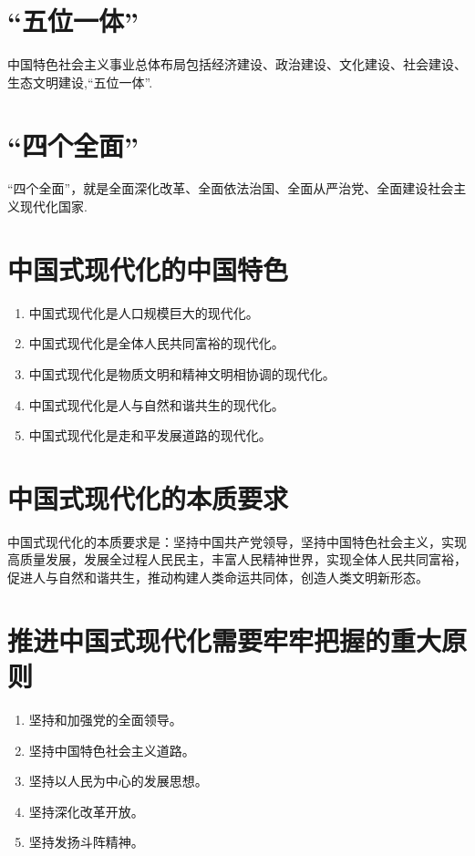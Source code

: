 \documentclass[12pt, a4paper, oneside]{ctexbook}
\begin{document}
\section{“五位一体”}

中国特色社会主义事业总体布局包括经济建设、政治建设、文化建设、社会建设、生态文明建设,“五位一体”.

\section{“四个全面”}

“四个全面”，就是全面深化改革、全面依法治国、全面从严治党、全面建设社会主义现代化国家.

\section{中国式现代化的中国特色}

\begin{enumerate}
\item 中国式现代化是人口规模巨大的现代化。

\item 中国式现代化是全体人民共同富裕的现代化。

\item 中国式现代化是物质文明和精神文明相协调的现代化。

\item 中国式现代化是人与自然和谐共生的现代化。

\item 中国式现代化是走和平发展道路的现代化。
\end{enumerate}

\section{中国式现代化的本质要求}

中国式现代化的本质要求是：坚持中国共产党领导，坚持中国特色社会主义，实现高质量发展，发展全过程人民民主，丰富人民精神世界，实现全体人民共同富裕，促进人与自然和谐共生，推动构建人类命运共同体，创造人类文明新形态。

\section{推进中国式现代化需要牢牢把握的重大原则}

\begin{enumerate}
\item 坚持和加强党的全面领导。

\item 坚持中国特色社会主义道路。

\item 坚持以人民为中心的发展思想。

\item 坚持深化改革开放。

\item 坚持发扬斗阵精神。
\end{enumerate}
\end{document}
